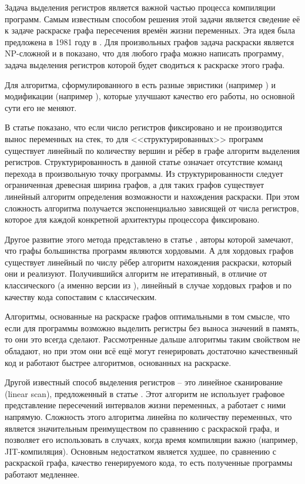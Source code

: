 \documentclass[a4paper,14pt]{extarticle}
\begin{document}
Задача выделения регистров является важной частью процесса компиляции программ.
Самым известным способом решения этой задачи является сведение её к задаче раскраске графа пересечения времён жизни переменных.
Эта идея была предложена в 1981 году в \cite{chaitin_register_1981}.
Для произвольных графов задача раскраски является NP-сложной и в \cite{chaitin_register_1981} показано,
что для любого графа можно написать программу, задача выделения регистров которой будет сводиться к раскраске этого графа.

Для алгоритма, сформулированного в \cite{chaitin_register_1981} есть разные эвристики (например \cite{briggs_rematerialization_1992})
и модификации (например \cite{george_iterated_1996}), которые улучшают качество его работы, но основной сути его не меняют.

В статье \cite{hans_l_bodlaender_linear-time_1997} показано, что если число регистров фиксировано и не производится вынос переменных на стек,
то для <<структурированных>> программ существует линейный по количеству вершин и рёбер в графе алгоритм выделения регистров.
Структурированность в данной статье означает отсутствие команд перехода в произвольную точку программы.
Из структурированности следует ограниченная древесная ширина графов,
а для таких графов существует линейный алгоритм определения возможности и нахождения раскраски.
При этом сложность алгоритма получается экспоненциально зависящей от числа регистров,
которое для каждой конкретной архитектуры процессора фиксировано.

Другое развитие этого метода представлено в статье \cite{hutchison_register_2005}, 
авторы которой замечают, что графы большинства программ являются хордовыми.
А для хордовых графов существует линейный по числу рёбер алгоритм нахождения раскраски, который они и реализуют. 
Получившийся алгоритм не итеративный, в отличие от классического (а именно версии из \cite{george_iterated_1996}),
линейный в случае хордовых графов и по качеству кода сопоставим с классическим.

Алгоритмы, основанные на раскраске графов оптимальными в том смысле,
что если для программы возможно выделить регистры без выноса значений в память, то они это всегда сделают.
Рассмотренные дальше алгоритмы таким свойством не обладают, но при этом они всё ещё могут генерировать достаточно качественный код
и работают быстрее алгоритмов, основанных на раскраске.

Другой известный способ выделения регистров -- это линейное сканирование (linear scan), предложенный в статье \cite{poletto_linear_1999}.
Этот алгоритм не использует графовое представление пересечений интервалов жизни переменных, а работает с ними напрямую.
Сложность этого алгоритма линейна по количеству переменных, что является значительным преимуществом по сравнению с раскраской графа,
и позволяет его использовать в случаях, когда время компиляции важно (например, JIT-компиляция).
Основным недостатком является худшее, по сравнению с раскраской графа, качество генерируемого кода, то есть полученные программы работают медленнее.
\end{document}
